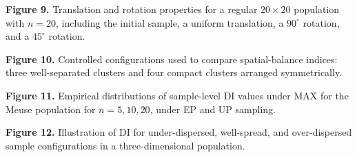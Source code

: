 \documentclass[12pt]{imsart}
\theoremstyle{plain}
\theoremstyle{remark}
\begin{document}
\noindent\textbf{Figure 9.} Translation and rotation properties for a regular \(20\times20\) population with \(n=20\), including the initial sample, a uniform translation, a \(90^\circ\) rotation, and a \(45^\circ\) rotation.\par\medskip
\noindent\textbf{Figure 10.} Controlled configurations used to compare spatial-balance indices: three well-separated clusters and four compact clusters arranged symmetrically.\par\medskip
\noindent\textbf{Figure 11.} Empirical distributions of sample-level DI values under MAX for the Meuse population for \(n=5,10,20\), under EP and UP sampling.\par\medskip
\noindent\textbf{Figure 12.} Illustration of DI for under-dispersed, well-spread, and over-dispersed sample configurations in a three-dimensional population.\par\medskip
\end{document}
